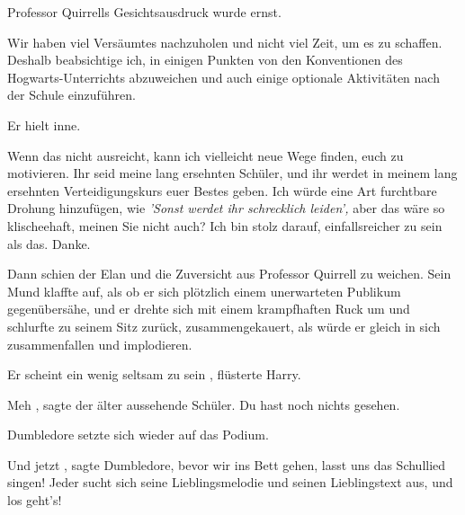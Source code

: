 Professor Quirrells Gesichtsausdruck wurde ernst.

\glqq Wir haben viel Versäumtes nachzuholen und nicht viel Zeit, um es zu
schaffen. Deshalb beabsichtige ich, in einigen Punkten von den Konventionen des
Hogwarts-Unterrichts abzuweichen und auch einige optionale Aktivitäten nach der
Schule einzuführen.\grqq{}

Er hielt inne.

\glqq Wenn das nicht ausreicht, kann ich vielleicht neue Wege finden, euch zu
motivieren. Ihr seid meine lang ersehnten Schüler, und ihr werdet in meinem lang
ersehnten Verteidigungskurs euer Bestes geben. Ich würde eine Art furchtbare
Drohung hinzufügen, wie
\emph{'Sonst werdet ihr schrecklich leiden',}
aber das wäre so klischeehaft, meinen Sie nicht auch? Ich bin stolz darauf,
einfallsreicher zu sein als das. Danke.\grqq{}

Dann schien der Elan und die Zuversicht aus Professor Quirrell zu weichen. Sein
Mund klaffte auf, als ob er sich plötzlich einem unerwarteten Publikum
gegenübersähe, und er drehte sich mit einem krampfhaften Ruck um und schlurfte
zu seinem Sitz zurück, zusammengekauert, als würde er gleich in sich
zusammenfallen und implodieren.

\glqq Er scheint ein wenig seltsam zu sein\grqq{} , flüsterte Harry.

\glqq Meh\grqq{} , sagte der älter aussehende Schüler. \glqq Du hast noch nichts
gesehen.\grqq{}

Dumbledore setzte sich wieder auf das Podium.

\glqq Und jetzt\grqq{} , sagte Dumbledore, \glqq bevor wir ins Bett gehen, lasst
uns das Schullied singen! Jeder sucht sich seine Lieblingsmelodie und seinen
Lieblingstext aus, und los geht's!\grqq{}